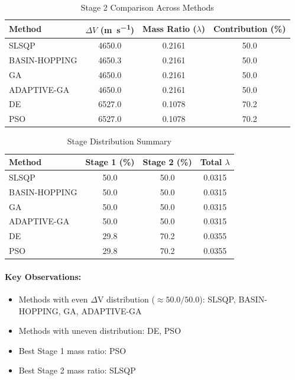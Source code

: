 \documentclass{article}
\begin{document}
\begin{table}[H]
\centering
\caption{Stage 2 Comparison Across Methods}
\begin{tabular}{lS[table-format=4.1]S[table-format=1.4]S[table-format=3.1]}
\toprule
Method & {$\Delta V$ (\si{\meter\per\second})} & {Mass Ratio ($\lambda$)} & {Contribution (\%)} \\
\midrule
SLSQP        & 4650.0 & 0.2161 & 50.0 \\
BASIN-HOPPING & 4650.3 & 0.2161 & 50.0 \\
GA           & 4650.0 & 0.2161 & 50.0 \\
ADAPTIVE-GA  & 4650.0 & 0.2161 & 50.0 \\
DE           & 6527.0 & 0.1078 & 70.2 \\
PSO          & 6527.0 & 0.1078 & 70.2 \\
\bottomrule
\end{tabular}
\end{table}

\begin{table}[H]
\centering
\caption{Stage Distribution Summary}
\begin{tabular}{lS[table-format=4.1]S[table-format=4.1]S[table-format=1.4]}
\toprule
Method & {Stage 1 (\%)} & {Stage 2 (\%)} & {Total $\lambda$} \\
\midrule
SLSQP        & 50.0 & 50.0 & 0.0315 \\
BASIN-HOPPING & 50.0 & 50.0 & 0.0315 \\
GA           & 50.0 & 50.0 & 0.0315 \\
ADAPTIVE-GA  & 50.0 & 50.0 & 0.0315 \\
DE           & 29.8 & 70.2 & 0.0355 \\
PSO          & 29.8 & 70.2 & 0.0355 \\
\bottomrule
\end{tabular}
\end{table}

\paragraph{Key Observations:}
\begin{itemize}
\item Methods with even $\Delta$V distribution ($\approx50.0/50.0$): SLSQP, BASIN-HOPPING, GA, ADAPTIVE-GA
\item Methods with uneven distribution: DE, PSO
\item Best Stage 1 mass ratio: PSO
\item Best Stage 2 mass ratio: SLSQP
\end{itemize}
\end{document}

